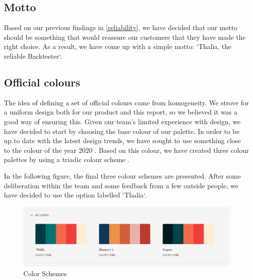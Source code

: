\documentclass[main.tex]{subfiles}
\begin{document}
\subsection{Motto}

Based on our previous findings in \ref{reliability}, we have decided that our motto should be something that would reassure our customers that they have made the right choice. As a result, we have come up with a simple motto: `Thalia, the reliable Backtester`.


\subsection{Official colours} 

The idea of defining a set of official colours came from homogeneity. We strove for a uniform design both for our product and this report, so we believed it was a good way of ensuring this. Given our team's limited experience with design, we have decided to start by choosing the base colour of our palette. In order to be up to date with the latest design trends, we have sought to use something close to the colour of the year 2020 \cite{pantone}. Based on this colour, we have created three colour palettes by using a triadic colour scheme \cite{triadic}.

In the following figure, the final three colour schemes are presented. After some deliberation within the team and some feedback from a few outside people, we have decided to use the option labelled `Thalia`.

\begin{figure}[H]
    \includegraphics[width=\textwidth]{00Branding/00Pictures/color_schemes.png}
    \caption{Color Schemes}
\end{figure}
\end{document}
